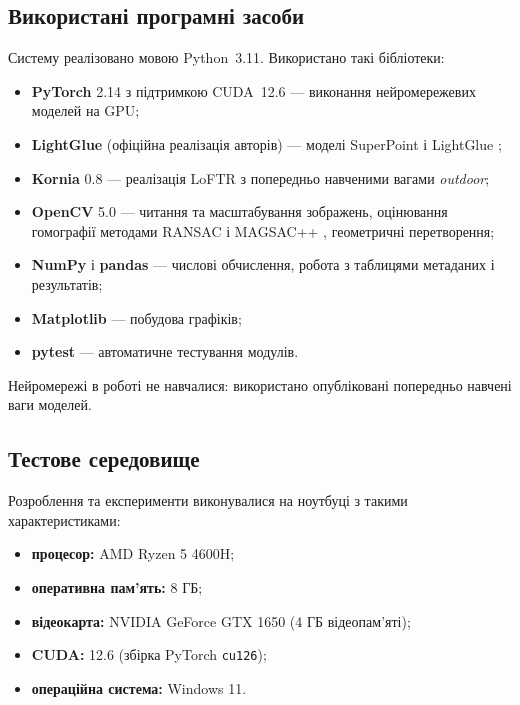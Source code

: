 \subsection{Використані програмні засоби}

Систему реалізовано мовою Python~3.11. Використано такі бібліотеки:
\begin{itemize}[label=\textbf{•}]
    \item \textbf{PyTorch} 2.14 з підтримкою CUDA~12.6 \cite{pytorch} --- виконання нейромережевих моделей на GPU;
    \item \textbf{LightGlue} (офіційна реалізація авторів) --- моделі SuperPoint \cite{superpoint} і LightGlue \cite{lightglue};
    \item \textbf{Kornia} 0.8 \cite{kornia} --- реалізація LoFTR \cite{loftr} з попередньо навченими вагами \textit{outdoor};
    \item \textbf{OpenCV} 5.0 \cite{opencv} --- читання та масштабування зображень, оцінювання гомографії методами RANSAC \cite{ransac} і MAGSAC++ \cite{magsac}, геометричні перетворення;
    \item \textbf{NumPy} і \textbf{pandas} --- числові обчислення, робота з таблицями метаданих і результатів;
    \item \textbf{Matplotlib} --- побудова графіків;
    \item \textbf{pytest} --- автоматичне тестування модулів.
\end{itemize}

Нейромережі в роботі не навчалися: використано опубліковані попередньо навчені ваги моделей.

\subsection{Тестове середовище}

Розроблення та експерименти виконувалися на ноутбуці з такими характеристиками:
\begin{itemize}[label=\textbf{--}]
    \item \textbf{процесор:} AMD Ryzen 5 4600H;
    \item \textbf{оперативна пам'ять:} 8 ГБ;
    \item \textbf{відеокарта:} NVIDIA GeForce GTX 1650 (4 ГБ відеопам'яті);
    \item \textbf{CUDA:} 12.6 (збірка PyTorch \texttt{cu126});
    \item \textbf{операційна система:} Windows 11.
\end{itemize}

